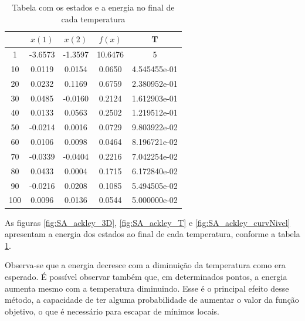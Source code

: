 \documentclass[conference,compsoc]{IEEEtran}
\begin{document}
\begin{table}[!htcb]
  \centering
  \begin{tabular}{|c|c|c|c|c|}
    \hline
    \rowcolor{kugray5}
		    &     $x(1)$   &       $x(2)$   &    $f(x)$    & T \\ \hline
\cellcolor{kugray5}1	  &   -3.6573   &  -1.3597	  &   10.6476   &  	5 \\ \hline
\rowcolor{kugray5}10	  &   0.0119	  &   0.0154	  &   0.0650	   &  4.545455e-01     \\ \hline
\cellcolor{kugray5}20	  &   0.0232	  &   0.1169	  &   0.6759	   &  2.380952e-01     \\ \hline
\rowcolor{kugray5}30	  &   0.0485	  &   -0.0160	  &   0.2124	   &  1.612903e-01     \\ \hline
\cellcolor{kugray5}40	  &   0.0133	  &    0.0563	  &   0.2502	   &  1.219512e-01     \\ \hline
\rowcolor{kugray5}50	  &   -0.0214   &  	0.0016	  &   0.0729	   &  9.803922e-02     \\ \hline
\cellcolor{kugray5}60	  &   0.0106	  &    0.0098	  &   0.0464	   &  8.196721e-02     \\ \hline
\rowcolor{kugray5}70	  &   -0.0339   &  	-0.0404	  &   0.2216	   &  7.042254e-02     \\ \hline
\cellcolor{kugray5}80	  &   0.0433	  &    0.0004	  &   0.1715	   &  6.172840e-02     \\ \hline
\rowcolor{kugray5}90	  &   -0.0216   &  	0.0208	  &   0.1085	   &  5.494505e-02     \\ \hline
\cellcolor{kugray5}100	  &   0.0096	  &    0.0136	  &   0.0544	   &  5.000000e-02     \\ \hline
	\end{tabular}
  \caption{Tabela com os estados e a energia no final de cada temperatura}
  \label{tab:SA_ackley}
\end{table}

As figuras  \ref{fig:SA_ackley_3D}, \ref{fig:SA_ackley_T} e \ref{fig:SA_ackley_curvNivel} apresentam a energia dos estados ao final de cada temperatura, conforme a tabela \ref{tab:SA_ackley}. 

Observa-se que a energia decresce com a diminuição da temperatura como era esperado. É possível observar também que, em determinados pontos, a energia aumenta mesmo com a temperatura diminuindo. Esse é o principal efeito desse método, a capacidade de ter alguma probabilidade de aumentar o valor da função objetivo, o que é necessário para escapar de mínimos locais.
\end{document}
